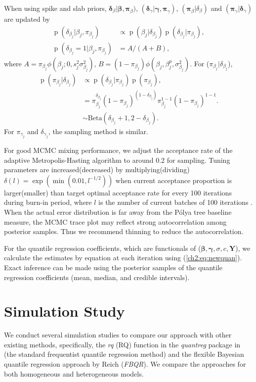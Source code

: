 \documentclass[12pt]{article}
\newcommand{\polya}{P\'{o}lya}
\DeclareMathOperator{\pr}{p}
\begin{document}
When using spike and slab priors,
$ \bm \delta_{\beta}|\bm \beta, \bm \pi_{\beta})$, $(\bm \delta_{\gamma}|\bm
\gamma, \bm \pi_{\gamma})$, $(\bm \pi_{\beta}|\delta_{\beta})$ and
$(\bm \pi_{\gamma}|\bm \delta_{\gamma})$ are updated by
\begin{align*}
  \pr(\delta_{\beta_j}|\beta_j, \pi_{\beta_j}) & \propto \pr(\beta_j |
  \delta_{\beta_j})
  \pr(\delta_{\beta_j}|\pi_{\beta_j}) ,\\
  \pr(\delta_{\beta_j} = 1|\beta_j, \pi_{\beta_j})& = A/(A + B),
\end{align*}
where $A = \pi_{\beta_j}\phi (\beta_j;0, s_j^2\sigma_{\beta_j}^2)$, $B
= (1-\pi_{\beta_j})\phi(\beta_j, \beta_j^p, \sigma_{\beta_j}^2)$.  For
($\pi_{\beta_j}|\delta_{\beta_j}$),
\begin{align*}
  \pr(\pi_{\beta_j}| \delta_{\beta_j}) & \propto \pr(\delta_{\beta_j}|\pi_{\beta_j}) \pr(\pi_{\beta_j}) ,\\
  & = \pi_{\beta_j}^{\delta_{\beta_j}} (1 - \pi_{\beta_j})^{(1 -
    \delta_{\beta_j})}
  \pi_{\beta_j}^{1 - 1}(1 - \pi_{\beta_j})^{1-1}.\\
  & \sim \mbox{Beta}(\delta_{\beta_j} + 1, 2 - \delta_{\beta_j}).
\end{align*}
For $\pi_{\gamma_j}$ and $\delta_{\gamma_j}$, the sampling method is
similar.

For good MCMC mixing performance, we adjust the acceptance rate of the
adaptive Metropolis-Hasting algorithm to around 0.2 for
sampling. Tuning parameters are increased(decreased) by
multiplying(dividing) $\delta(l) = \exp(\min(0.01, l^{-1/2}))$ when
current acceptance proportion is larger(smaller) than target optimal
acceptance rate for every 100 iterations during burn-in period, where
$l$ is the number of current batches of 100 iterations
\citep{jara2009}. When the actual error distribution is far away from
the \polya{} tree baseline measure, the MCMC trace plot may reflect strong
autocorrelation among posterior samples. Thus we recommend thinning
to reduce the autocorrelation.

For the quantile regression coefficients, which are functionals of
($\bm \beta, \bm \gamma, \sigma, c, \bm Y$), we calculate the
estimates by equation at each iteration using
(\ref{ch2:eq:newquan}). Exact inference can be made using the posterior
samples of the quantile regression coefficients (mean, median, and
credible intervals).

\section{Simulation Study}
\label{ch2:sec:simulations}
We conduct several simulation studies to compare our approach with
other existing methods, specifically, the \textit{rq} (RQ) function in the
\textit{quantreg} package \citep{quantreg} in \cite{R} (the standard
frequentist quantile regression method) and the flexible Bayesian
quantile regression approach by Reich (\textit{FBQR}).  We compare the
approaches for both homogeneous and heterogeneous models.
\end{document}
